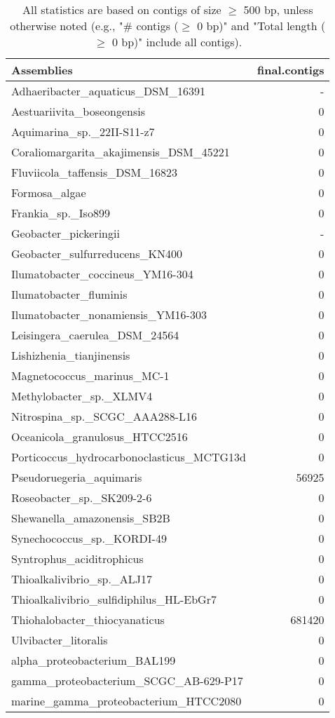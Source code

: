 \documentclass[12pt,a4paper]{article}
\begin{document}
\begin{table}[ht]
\begin{center}
\caption{All statistics are based on contigs of size $\geq$ 500 bp, unless otherwise noted (e.g., "\# contigs ($\geq$ 0 bp)" and "Total length ($\geq$ 0 bp)" include all contigs).}
\begin{tabular}{|l*{1}{|r}|}
\hline
Assemblies & final.contigs \\ \hline
Adhaeribacter\_aquaticus\_DSM\_16391 & - \\ \hline
Aestuariivita\_boseongensis & 0 \\ \hline
Aquimarina\_sp.\_22II-S11-z7 & 0 \\ \hline
Coraliomargarita\_akajimensis\_DSM\_45221 & 0 \\ \hline
Fluviicola\_taffensis\_DSM\_16823 & 0 \\ \hline
Formosa\_algae & 0 \\ \hline
Frankia\_sp.\_Iso899 & 0 \\ \hline
Geobacter\_pickeringii & - \\ \hline
Geobacter\_sulfurreducens\_KN400 & 0 \\ \hline
Ilumatobacter\_coccineus\_YM16-304 & 0 \\ \hline
Ilumatobacter\_fluminis & 0 \\ \hline
Ilumatobacter\_nonamiensis\_YM16-303 & 0 \\ \hline
Leisingera\_caerulea\_DSM\_24564 & 0 \\ \hline
Lishizhenia\_tianjinensis & 0 \\ \hline
Magnetococcus\_marinus\_MC-1 & 0 \\ \hline
Methylobacter\_sp.\_XLMV4 & 0 \\ \hline
Nitrospina\_sp.\_SCGC\_AAA288-L16 & 0 \\ \hline
Oceanicola\_granulosus\_HTCC2516 & 0 \\ \hline
Porticoccus\_hydrocarbonoclasticus\_MCTG13d & 0 \\ \hline
Pseudoruegeria\_aquimaris & 56925 \\ \hline
Roseobacter\_sp.\_SK209-2-6 & 0 \\ \hline
Shewanella\_amazonensis\_SB2B & 0 \\ \hline
Synechococcus\_sp.\_KORDI-49 & 0 \\ \hline
Syntrophus\_aciditrophicus & 0 \\ \hline
Thioalkalivibrio\_sp.\_ALJ17 & 0 \\ \hline
Thioalkalivibrio\_sulfidiphilus\_HL-EbGr7 & 0 \\ \hline
Thiohalobacter\_thiocyanaticus & 681420 \\ \hline
Ulvibacter\_litoralis & 0 \\ \hline
alpha\_proteobacterium\_BAL199 & 0 \\ \hline
gamma\_proteobacterium\_SCGC\_AB-629-P17 & 0 \\ \hline
marine\_gamma\_proteobacterium\_HTCC2080 & 0 \\ \hline
\end{tabular}
\end{center}
\end{table}
\end{document}
